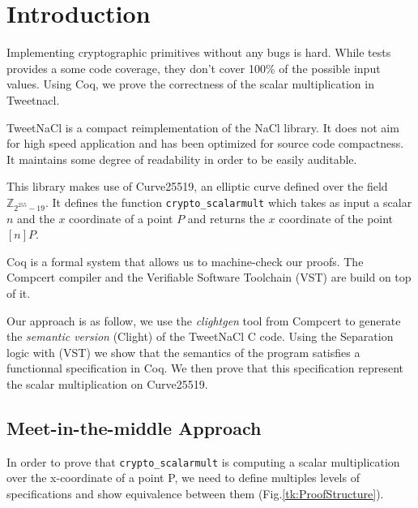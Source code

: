 \section{Introduction}

Implementing cryptographic primitives without any bugs is hard.
While tests provides a some code coverage, they don't cover
100\% of the possible input values. Using Coq, we prove the
correctness of the scalar multiplication in Tweetnacl.

TweetNaCl\cite{BGJ+15} is a compact reimplementation of the
NaCl\cite{BLS12} library. It does not aim for high speed
application and has been optimized for source code compactness.
It maintains some degree of readability in order to be
easily auditable.

This library makes use of Curve25519\cite{Ber06}, an elliptic
curve defined over the field $\mathbb{Z}_{2^{255}-19}$.
It defines the function \texttt{crypto\_scalarmult} which
takes as input a scalar $n$ and the $x$ coordinate of a
point $P$ and returns the $x$ coordinate of the
point $[n]P$.

Coq is a formal system that allows us to machine-check our proofs. The Compcert\cite{Leroy-backend}
compiler and the Verifiable Software Toolchain (VST)\cite{2012-Appel} are build
on top of it.

Our approach is as follow, we use the \textit{clightgen} tool from Compcert to
generate the \textit{semantic version} (Clight\cite{Blazy-Leroy-Clight-09}) of
the TweetNaCl C code. Using the Separation logic\cite{1969-Hoare,Reynolds02separationlogic}
with (VST) we show that the semantics of the program satisfies a functionnal
specification in Coq. We then prove that this specification represent the scalar
multiplication on Curve25519.

\subsection{Meet-in-the-middle Approach}

In order to prove that \texttt{crypto\_scalarmult} is computing a scalar
multiplication over the x-coordinate of a point P, we need to define multiples
levels of specifications and show equivalence between them (Fig.\ref{tk:ProofStructure}).

